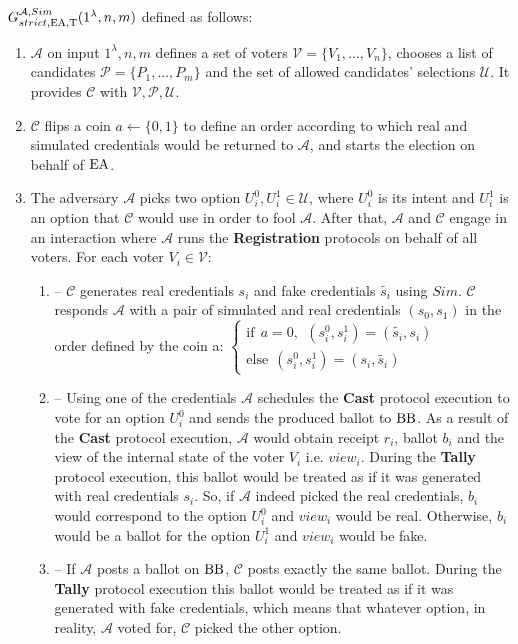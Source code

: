 $G_{strict,\operatorname{EA},\operatorname{T}}^{\mathcal{A}, Sim}(1^{\lambda},n,m)$ defined as follows:\\
\begin{enumerate}
\item $\mathcal{A}$ on input $1^{\lambda},n,m$ defines a set of voters  $\mathcal{V} = \{V_1,...,V_n\}$, chooses a list of candidates  $\mathcal{P} = \{P_1,...,P_m\}$ and the set of allowed candidates' selections $\mathcal{U}$.  It provides $\mathcal{C}$ with $\mathcal{V}, \mathcal{P}, \mathcal{U}$.
\item $\mathcal{C}$ flips a coin $a \leftarrow \{0,1\}$ to define an order according to which real and simulated credentials would be returned to $\mathcal{A}$, and starts the election on behalf of $\operatorname{EA}$. 
\item The adversary $\mathcal{A}$ picks two option $U^0_i,U^1_i \in \mathcal{U}$, where $U^0_i$ is its intent and $U^1_i$ is an option that $\mathcal{C}$ would use in order to fool $\mathcal{A}$. After that, $\mathcal{A}$  and $\mathcal{C}$ engage in an interaction where $\mathcal{A}$ runs the \textbf{Registration} protocols on behalf of all voters. For each voter $V_i \in \mathcal{V}$:
\begin{enumerate}
\item[] --  $\mathcal{C}$ generates real credentials $s_i$  and fake credentials $\tilde{s_i}$ using $Sim$.  $\mathcal{C}$  responds  $\mathcal{A}$ with a pair of simulated and real credentials $(s_0,s_1)$ in the order defined by the coin a:
$ \begin{cases}
 \text{if} ~~a =0,~~ (s^0_i,s^1_i) = (\tilde{s_i},s_i)  \\ 
 \text{else}~~  (s^0_i,s^1_i) = (s_i,\tilde{s_i})
\end{cases}$
\item[] -- Using one of the credentials $\mathcal{A}$ schedules the \textbf{Cast} protocol execution to vote for an option $U^0_i$ and sends the produced ballot to $\operatorname{BB}$. As a result of the \textbf{Cast} protocol execution, $\mathcal{A}$ would obtain receipt $r_i$, ballot $b_i$ and the view of the internal state of the voter $V_i$ i.e. $view_i$.  During the \textbf{Tally} protocol execution, this ballot would be treated as if it was generated with real credentials $s_i$. So, if  $\mathcal{A}$ indeed picked the real credentials, $b_i$ would correspond to the option   $U^0_i$  and $view_i$ would be real. Otherwise, $b_i$ would be a ballot for the option  $U^1_i$ and $view_i$ would be fake. 
\item[] --  If  $\mathcal{A}$ posts a ballot on $\operatorname{BB}$, $\mathcal{C}$ posts exactly the same ballot. During the \textbf{Tally} protocol execution this ballot would be treated as if it was generated with fake credentials, which means that whatever option, in reality, $\mathcal{A}$ voted for, $\mathcal{C}$ picked the other option.  

\end{enumerate}
\end{enumerate}
